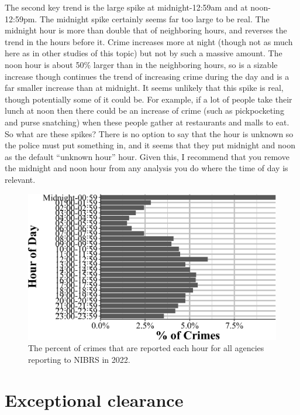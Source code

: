 \documentclass[
  12pt,
  openany]{book}
\begin{document}
The second key trend is the large spike at midnight-12:59am and at noon-12:59pm. The midnight spike certainly seems far too large to be real. The midnight hour is more than double that of neighboring hours, and reverses the trend in the hours before it. Crime increases more at night (though not as much here as in other studies of this topic) but not by such a massive amount. The noon hour is about 50\% larger than in the neighboring hours, so is a sizable increase though continues the trend of increasing crime during the day and is a far smaller increase than at midnight. It seems unlikely that this spike is real, though potentially some of it could be. For example, if a lot of people take their lunch at noon then there could be an increase of crime (such as pickpocketing and purse snatching) when these people gather at restaurants and malls to eat. So what are these spikes? There is no option to say that the hour is unknown so the police must put something in, and it seems that they put midnight and noon as the default ``unknown hour'' hour. Given this, I recommend that you remove the midnight and noon hour from any analysis you do where the time of day is relevant.

\begin{figure}

{\centering \includegraphics[width=0.9\linewidth]{12_nibrs_administrative_files/figure-latex/administrativeHours-1} 

}

\caption{The percent of crimes that are reported each hour for all agencies reporting to NIBRS in 2022.}\label{fig:administrativeHours}
\end{figure}

\section{Exceptional clearance}\label{exceptional-clearance}
\end{document}
